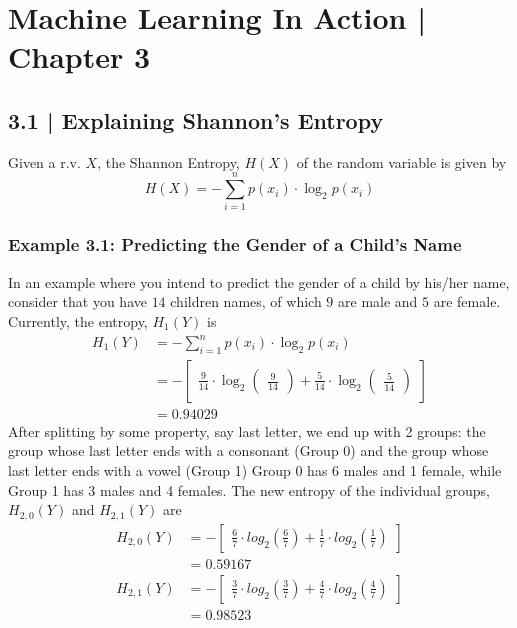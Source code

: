 \documentclass[11pt]{article}
\begin{document}
\section*{Machine Learning In Action | Chapter 3}
\subsection*{3.1 | Explaining Shannon's Entropy}
Given a r.v. $X$, the Shannon Entropy, $H(X)$ of the random variable is given by 
\begin{equation}
H(X) = -\sum_{i=1}^n p(x_i)\cdot \log_2p(x_i)
\end{equation}
\subsubsection*{Example 3.1: Predicting the Gender of a Child's Name}
In an example where you intend to predict the gender of a child by his/her name, consider that you have $14$ children names, of which $9$ are male and $5$ are female. Currently, the entropy, $H_1(Y)$ is
\begin{align*}
H_1(Y) &= -\sum_{i=1}^n p(x_i)\cdot \log_2p(x_i)\\
&= -\begin{bmatrix}\frac 9 {14} \cdot \log_2 \begin{pmatrix}\frac 9 {14}\end{pmatrix} + \frac 5 {14} \cdot \log_2 \begin{pmatrix}\frac 5 {14}\end{pmatrix}\end{bmatrix}
\\&=0.94029
\end{align*}
After splitting by some property, say last letter, we end up with 2 groups: the group whose last letter ends with a consonant (Group 0) and the group whose last letter ends with a vowel (Group 1) Group 0 has 6 males and 1 female, while Group 1 has 3 males and 4 females. The new entropy of the individual groups, $H_{2,0}(Y)$ and $H_{2,1}(Y)$ are
\begin{align*}
H_{2,0}(Y) &=-\begin{bmatrix}
\frac 67\cdot log_2(\frac 67) + \frac 17\cdot log_2(\frac 17) \end{bmatrix}\\&=0.59167\\
H_{2,1}(Y) &=-\begin{bmatrix}\frac 37\cdot log_2(\frac 37) + \frac 47\cdot log_2(\frac 47)\end{bmatrix} \\&=0.98523\\
\end{align*}
\end{document}
